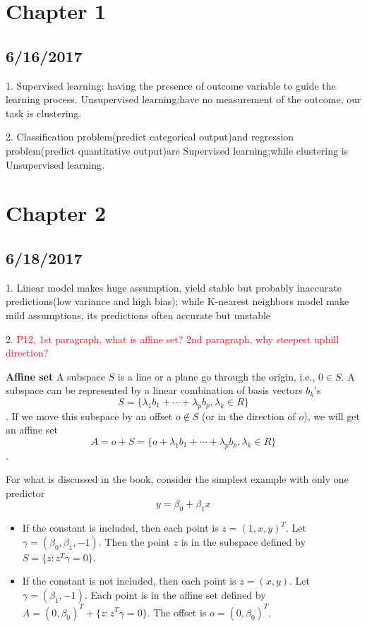 \documentclass[a4paper, 12pt]{article}
\begin{document}
\section*{Chapter 1} %
\subsection*{6/16/2017}

1. Supervised learning: having the presence of outcome variable to guide the learning process. Unsupervised learning:have no measurement of the outcome, our task is clustering.

2. Classification problem(predict categorical output)and regression problem(predict quantitative output)are Supervised learning;while clustering is Unsupervised learning.

\section*{Chapter 2}
\subsection*{6/18/2017}

1. Linear model  makes huge assumption, yield stable but probably inaccurate predictions(low variance and high bias); while K-nearest neighbors model make mild assumptions, its predictions often accurate but unstable

2. \textcolor{red}{ P12,  1st paragraph, what is affine set? 	2nd paragraph, why steepest uphill direction?}

\textbf{Affine set} A subspace $S$ is a line or a plane go through the origin, i.e., $0\in S$. A subspace can be represented by a linear combination of basis vectors $b_k$'s
$$S = \{\lambda_1 b_1+\cdots+\lambda_p b_p, \lambda_k\in R\}$$.
If we move this subspace by an offset $o\notin S$ (or in the direction of $o$), we will get an affine set
$$A = o+S = \{o+\lambda_1 b_1+\cdots+\lambda_p b_p, \lambda_k\in R\}$$.

For what is discussed in the book, consider the simplest example with only one predictor
$$
y = \beta_0 + \beta_1 x
$$
\begin{itemize}
	\item If the constant is included, then each point is $z = (1,x,y)^T$. Let $\gamma = (\beta_0, \beta_1, -1)$. Then the point $z$ is in the subspace defined by $S = \{z: z^T\gamma = 0\}$.
	\item  If the constant is not included, then each point is $z = (x,y)$. Let $\gamma = (\beta_1, -1)$. Each point is in the affine set defined by $A = (0, \beta_0)^T + \{
	z: z^T\gamma = 0\}$. The offset is $o=(0, \beta_0)^T$.
\end{itemize}
\end{document}
